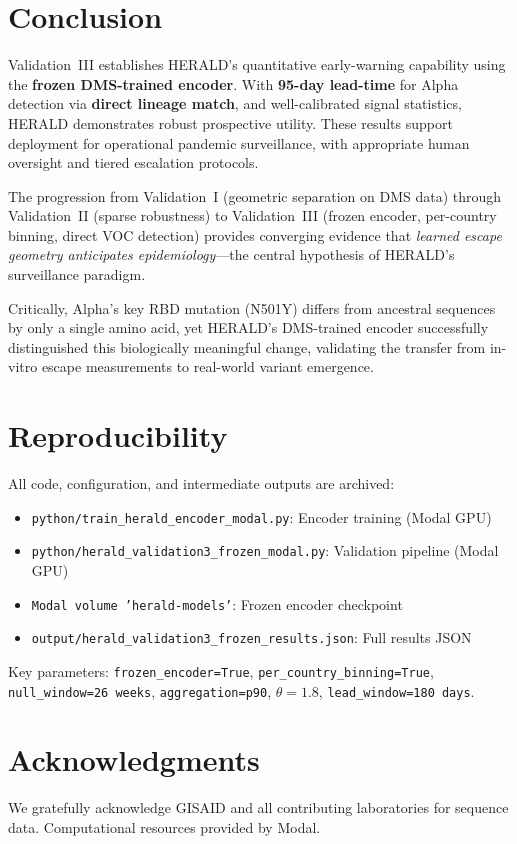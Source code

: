 \documentclass[11pt]{article}
\begin{document}
\section{Conclusion}
Validation~III establishes HERALD's quantitative early-warning capability using the \textbf{frozen DMS-trained encoder}. With \textbf{95-day lead-time} for Alpha detection via \textbf{direct lineage match}, and well-calibrated signal statistics, HERALD demonstrates robust prospective utility. These results support deployment for operational pandemic surveillance, with appropriate human oversight and tiered escalation protocols.

The progression from Validation~I (geometric separation on DMS data) through Validation~II (sparse robustness) to Validation~III (frozen encoder, per-country binning, direct VOC detection) provides converging evidence that \emph{learned escape geometry anticipates epidemiology}---the central hypothesis of HERALD's surveillance paradigm.

Critically, Alpha's key RBD mutation (N501Y) differs from ancestral sequences by only a single amino acid, yet HERALD's DMS-trained encoder successfully distinguished this biologically meaningful change, validating the transfer from in-vitro escape measurements to real-world variant emergence.

\section*{Reproducibility}
All code, configuration, and intermediate outputs are archived:
\begin{itemize}[leftmargin=1.1em]
  \item \texttt{python/train\_herald\_encoder\_modal.py}: Encoder training (Modal GPU)
  \item \texttt{python/herald\_validation3\_frozen\_modal.py}: Validation pipeline (Modal GPU)
  \item \texttt{Modal volume 'herald-models'}: Frozen encoder checkpoint
  \item \texttt{output/herald\_validation3\_frozen\_results.json}: Full results JSON
\end{itemize}

\noindent Key parameters: \texttt{frozen\_encoder=True}, \texttt{per\_country\_binning=True}, \texttt{null\_window=26~weeks}, \texttt{aggregation=p90}, $\theta=1.8$, \texttt{lead\_window=180~days}.

\section*{Acknowledgments}
We gratefully acknowledge GISAID and all contributing laboratories for sequence data. Computational resources provided by Modal.
\end{document}
